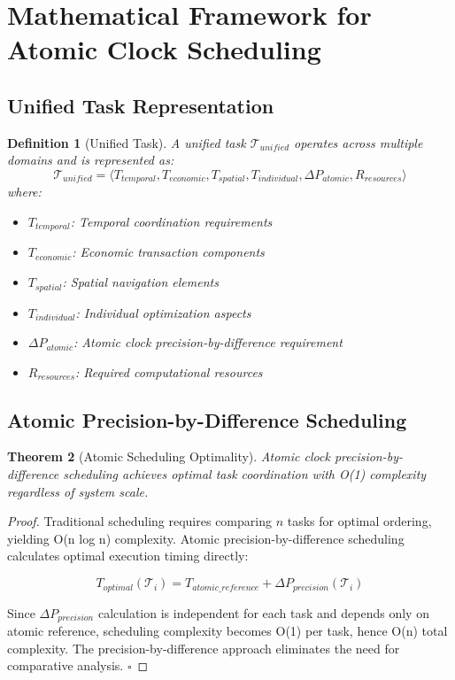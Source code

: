 \documentclass[12pt,a4paper]{article}
\newtheorem{theorem}{Theorem}[section]
\newtheorem{definition}[theorem]{Definition}
\begin{document}
\section{Mathematical Framework for Atomic Clock Scheduling}

\subsection{Unified Task Representation}

\begin{definition}[Unified Task]
A unified task $\mathcal{T}_{unified}$ operates across multiple domains and is represented as:
\begin{equation}
\mathcal{T}_{unified} = \langle T_{temporal}, T_{economic}, T_{spatial}, T_{individual}, \Delta P_{atomic}, R_{resources} \rangle
\end{equation}
where:
\begin{itemize}
\item $T_{temporal}$: Temporal coordination requirements
\item $T_{economic}$: Economic transaction components
\item $T_{spatial}$: Spatial navigation elements
\item $T_{individual}$: Individual optimization aspects
\item $\Delta P_{atomic}$: Atomic clock precision-by-difference requirement
\item $R_{resources}$: Required computational resources
\end{itemize}
\end{definition}

\subsection{Atomic Precision-by-Difference Scheduling}

\begin{theorem}[Atomic Scheduling Optimality]
Atomic clock precision-by-difference scheduling achieves optimal task coordination with O(1) complexity regardless of system scale.
\end{theorem}

\begin{proof}
Traditional scheduling requires comparing $n$ tasks for optimal ordering, yielding O(n log n) complexity. Atomic precision-by-difference scheduling calculates optimal execution timing directly:

\begin{equation}
T_{optimal}(\mathcal{T}_i) = T_{atomic\_reference} + \Delta P_{precision}(\mathcal{T}_i)
\end{equation}

Since $\Delta P_{precision}$ calculation is independent for each task and depends only on atomic reference, scheduling complexity becomes O(1) per task, hence O(n) total complexity. The precision-by-difference approach eliminates the need for comparative analysis. $\square$
\end{proof}
\end{document}
